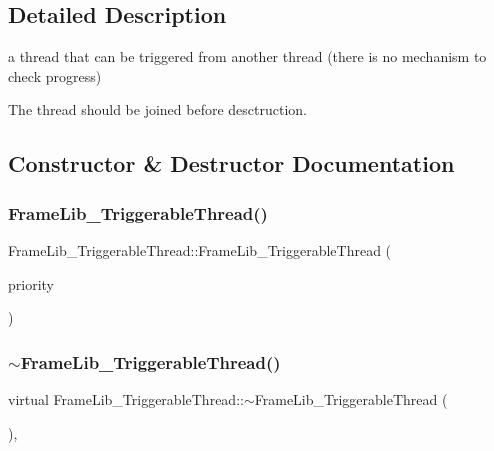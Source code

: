 \subsection{Detailed Description}
a thread that can be triggered from another thread (there is no mechanism to check progress) 

The thread should be joined before desctruction. 

\subsection{Constructor \& Destructor Documentation}
\mbox{\label{class_frame_lib___triggerable_thread_aadb78b7fcf753d3d3f98bdb234d9db42}} 
\subsubsection{\texorpdfstring{Frame\+Lib\+\_\+\+Triggerable\+Thread()}{FrameLib\_TriggerableThread()}\hspace{0.1cm}{\footnotesize\ttfamily [1/2]}}
{\footnotesize\ttfamily Frame\+Lib\+\_\+\+Triggerable\+Thread\+::\+Frame\+Lib\+\_\+\+Triggerable\+Thread (\begin{DoxyParamCaption}\item[{\hyperlink{class_frame_lib___thread_a99a5e56edcadf37e3388f5557e8ec7ed}{Frame\+Lib\+\_\+\+Thread\+::\+Priority\+Level}}]{priority }\end{DoxyParamCaption})\hspace{0.3cm}{\ttfamily [inline]}}

\mbox{\label{class_frame_lib___triggerable_thread_a443b8f9470e10c6cf322c6f77bc792e1}} 
\subsubsection{\texorpdfstring{$\sim$\+Frame\+Lib\+\_\+\+Triggerable\+Thread()}{~FrameLib\_TriggerableThread()}}
{\footnotesize\ttfamily virtual Frame\+Lib\+\_\+\+Triggerable\+Thread\+::$\sim$\+Frame\+Lib\+\_\+\+Triggerable\+Thread (\begin{DoxyParamCaption}{ }\end{DoxyParamCaption})\hspace{0.3cm}{\ttfamily [inline]}, {\ttfamily [virtual]}}

